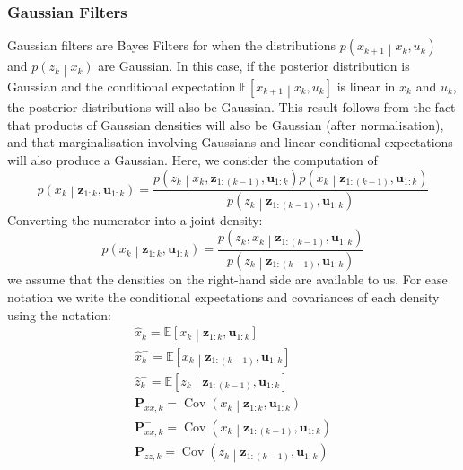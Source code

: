\documentclass[11pt]{report} %
\begin{document}
\subsubsection{Gaussian Filters}

Gaussian filters are Bayes Filters for when the distributions $p\left(x_{k + 1}\middle|x_{k}, u_{k}\right)$ and $p\left(z_{k}\middle|x_{k}\right)$ are Gaussian. In this case, if the posterior distribution is Gaussian and the conditional expectation $\mathbb{E}\left[x_{k + 1}\middle|x_{k}, u_{k}\right]$ is linear in $x_{k}$ and $u_{k}$, the posterior distributions will also be Gaussian. This result follows from the fact that products of Gaussian densities will also be Gaussian (after normalisation), and that marginalisation involving Gaussians and linear conditional expectations will also produce a Gaussian. Here, we consider the computation of
\begin{equation}
p\left(x_{k}\middle|\mathbf{z}_{1:k}, \mathbf{u}_{1:k}\right) = \dfrac{p\left(z_{k}\middle|x_{k}, \mathbf{z}_{1:\left(k - 1\right)}, \mathbf{u}_{1:k}\right)p\left(x_{k}\middle|\mathbf{z}_{1:\left(k - 1\right)}, \mathbf{u}_{1:k}\right)}{p\left(z_{k}\middle|\mathbf{z}_{1:\left(k - 1\right)}, \mathbf{u}_{1:k}\right)}
\end{equation}
Converting the numerator into a joint density:
\begin{equation}
p\left(x_{k}\middle|\mathbf{z}_{1:k}, \mathbf{u}_{1:k}\right) = \dfrac{p\left(z_{k}, x_{k}\middle|\mathbf{z}_{1:\left(k - 1\right)}, \mathbf{u}_{1:k}\right)}{p\left(z_{k}\middle|\mathbf{z}_{1:\left(k - 1\right)}, \mathbf{u}_{1:k}\right)}
\end{equation}
we assume that the densities on the right-hand side are available to us. For ease notation we write the conditional expectations and covariances of each density using the notation:
\begin{gather}
\hat{x}_{k} = \mathbb{E}\left[x_{k}\middle|\mathbf{z}_{1:k}, \mathbf{u}_{1:k}\right] \\
\hat{x}_{k}^{-} = \mathbb{E}\left[x_{k}\middle|\mathbf{z}_{1:\left(k - 1\right)}, \mathbf{u}_{1:k}\right] \\
\hat{z}_{k}^{-} = \mathbb{E}\left[z_{k}\middle|\mathbf{z}_{1:\left(k - 1\right)}, \mathbf{u}_{1:k}\right] \\
\mathbf{P}_{xx, k} = \operatorname{Cov}\left(x_{k}\middle|\mathbf{z}_{1:k}, \mathbf{u}_{1:k}\right) \\
\mathbf{P}_{xx, k}^{-} = \operatorname{Cov}\left(x_{k}\middle|\mathbf{z}_{1:\left(k - 1\right)}, \mathbf{u}_{1:k}\right) \\
\mathbf{P}_{zz, k}^{-} = \operatorname{Cov}\left(z_{k}\middle|\mathbf{z}_{1:\left(k - 1\right)}, \mathbf{u}_{1:k}\right)
\end{gather}
\end{document}
